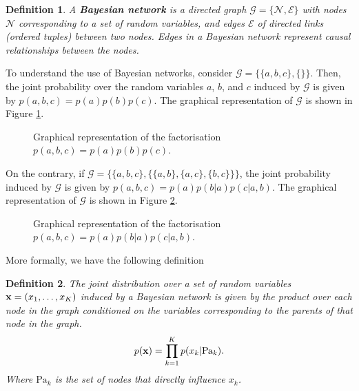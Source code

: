 \documentclass[11pt]{article}
\numberwithin{equation}{section}
\newcommand{\x}{{\bf x}}
\newtheorem{definition}{Definition}[section]
\begin{document}
\begin{definition}
	A \textbf{Bayesian network} is a directed graph $\mathcal G = \{\mathscr{N}, \mathscr{E}\}$ with nodes $\mathscr{N}$ corresponding to a set of random variables, and edges $\mathscr{E}$ of directed links (ordered tuples) between two nodes. Edges in a Bayesian network represent causal relationships between the nodes.
\end{definition}

To understand the use of Bayesian networks, consider $\mathcal G = \{\{a, b, c\}, \{\}\}$. Then, the joint probability over the random variables $a$, $b$, and $c$ induced by $\mathcal G$ is given by $p(a,b,c) = p(a) p(b) p(c)$. The graphical representation of $\mathcal G$ is shown in Figure \ref{fig:bayes-net-1}.

\begin{figure}[h!]
	\centering
	
	\caption{Graphical representation of the factorisation $p(a,b,c) = p(a) p(b) p(c)$.}
	\label{fig:bayes-net-1}
\end{figure}

On the contrary, if $\mathcal G = \{\{a,b,c\}, \{\{a, b\}, \{a, c\}, \{b, c\}\}\}$, the joint probability induced by $\mathcal G$ is given by  $p(a,b,c) = p(a)p(b \vert a)p(c \vert a, b)$. The graphical representation of $\mathcal G$ is shown in Figure \ref{fig:bayes-net-2}.

\begin{figure}[h!]
	\centering
	
	\caption{Graphical representation of the factorisation $p(a,b,c) = p(a) p(b \vert a) p(c \vert a, b)$.}
	\label{fig:bayes-net-2}
\end{figure}


More formally, we have the following definition
\begin{definition}
	The joint distribution over a set of random variables $\x = (x_1, \ldots, x_K)$ induced by a Bayesian network is given by the product over each node in the graph conditioned on the variables corresponding to the parents of that node in the graph.
	\begin{equation}
		p({\bf x}) = \prod_{k=1}^K p(x_k \vert \text{Pa}_k).
	\end{equation}
	Where $\text{Pa}_k$ is the set of nodes that directly influence $x_k$.
\end{definition}
\end{document}
